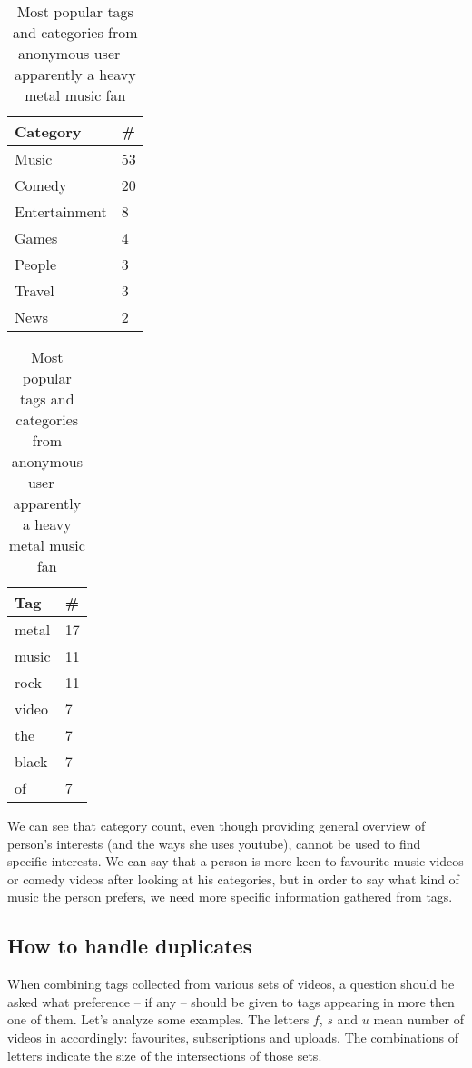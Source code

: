 \begin{table}[ht]
\begin{minipage}[b]{0.5\linewidth}\centering

\begin{tabular}{| l | l |}
Category & \# \\ \hline
Music & 53 \\
Comedy & 20 \\
Entertainment & 8 \\
Games & 4 \\
People & 3 \\
Travel & 3 \\
News & 2 \\
\end{tabular}

\end{minipage}
\hspace{0.5cm}
\begin{minipage}[b]{0.5\linewidth}
\centering

\begin{tabular}{| l | l |}
Tag & \# \\ \hline
metal & 17 \\
music & 11 \\
rock & 11 \\
video & 7 \\
the & 7 \\
black & 7 \\
of & 7 \\
\end{tabular}

\end{minipage}

\caption{Most popular tags and categories from anonymous user -- apparently a
heavy metal music fan}
\end{table}

We can see that category count, even though providing general overview of
person's interests (and the ways she uses youtube), cannot be used to find
specific interests. We can say that a person is more keen to
favourite music videos or comedy videos after looking at his categories, but in
order to say what kind of music the person prefers, we need more specific
information gathered from \eg tags.

\subsection{How to handle duplicates}

When combining tags collected from various sets of videos, a question should be
asked what preference -- if any -- should be given to tags appearing in more
then one of them. Let's analyze some examples. The letters $f$, $s$ and $u$ mean number
of videos in accordingly: favourites, subscriptions and uploads. The
combinations of letters indicate the size of the intersections of those sets. \\

